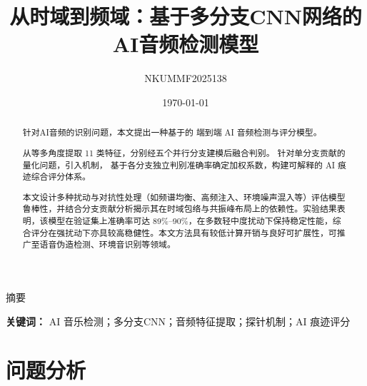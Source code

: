 \documentclass[aspectratio=169]{beamer}
\title{从时域到频域：基于多分支CNN网络的AI音频检测模型}
\author{NKUMMF2025138}
\date{\today}
\begin{document}
\begin{frame}
  \titlepage
\end{frame}


\begin{frame}{摘要}
\small

\vspace{1cm}

\begin{abstract}
针对AI音频的识别问题，本文提出一种基于的
端到端 AI 音频检测与评分模型。

从等多角度提取 11 类特征，分别经五个并行分支建模后融合判别。
针对单分支贡献的量化问题，引入机制，
基于各分支独立判别准确率确定加权系数，构建可解释的 AI 痕迹综合评分体系。

本文设计多种扰动与对抗性处理（如频谱均衡、高频注入、环境噪声混入等）评估模型鲁棒性，并结合分支贡献分析揭示其在时域包络与共振峰布局上的依赖性。实验结果表明，该模型在验证集上准确率可达 89\%–90\%，在多数轻中度扰动下保持稳定性能，综合评分在强扰动下亦具较高稳健性。本文方法具有较低计算开销与良好可扩展性，可推广至语音伪造检测、环境音识别等领域。
\end{abstract}

\vspace{0.5em}
\noindent\textbf{关键词：} AI 音乐检测；多分支CNN；音频特征提取；探针机制；AI 痕迹评分

\end{frame}



\section{问题分析}
\end{document}
